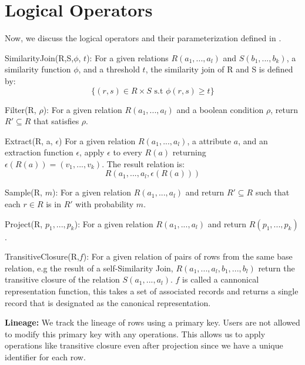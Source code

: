 \section{Logical Operators}
Now, we discuss the logical operators and their parameterization defined in \projx.

\vspace{0.5em}

\noindent \textsf{SimilarityJoin(R,S,$\phi$, $t$)}: For a given relations $R(a_1,...,a_l)$ and $S(b_1,...,b_k)$, a similarity function $\phi$, and a threshold $t$, the similarity join of R and S is defined by:
\[
\{ (r,s) \in R \times S \text{ s.t } \phi (r,s) \ge t \}
\]

\vspace{0.5em}


\noindent \textsf{Filter(R, $\rho$)}: For a given relation $R(a_1,...,a_l)$ and a boolean condition $\rho$, return $R' \subseteq R$ that satisfies $\rho$.

\vspace{0.5em}

\noindent \textsf{Extract(R, a, $\epsilon$)} For a given relation $R(a_1,...,a_l)$, a attribute $a$, and an extraction function $\epsilon$, apply $\epsilon$ to every $R(a)$ returning $\epsilon(R(a)) = (v_1,...,v_k)$. The result relation is:
\[
R(a_1,...,a_l,\epsilon(R(a)))
\]

\noindent \textsf{Sample(R, $m$)}: For a given relation $R(a_1,...,a_l)$ and return $R' \subseteq R$ such that each $r \in R$ is in $R'$ with probability $m$.

\vspace{0.5em}

\noindent \textsf{Project(R, $p_1,...,p_k$)}: For a given relation $R(a_1,...,a_l)$ and return $R(p_1,...,p_k)$.

\vspace{0.5em}

\noindent \textsf{TransitiveClosure(R,$f$)}: For a given relation of pairs of rows from the same base relation, e.g the result of a self-Similarity Join, $R(a_1,...,a_l, b_1,...,b_l)$ return the transitive closure of the relation $S(a_1,...,a_l)$. $f$ is called a cannonical representation function, this takes a set of associated records and returns a single record that is designated as the canonical representation.

\vspace{1em}

\noindent\textbf{Lineage: }
We track the lineage of rows using a primary key.
Users are not allowed to modify this primary key with any operations.
This allows us to apply operations like transitive closure even after projection since we have a unique identifier for each row.


